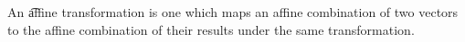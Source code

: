 


An \t{affine transformation} is one which maps an affine combination of two vectors to the affine combination of their results under the same transformation.
